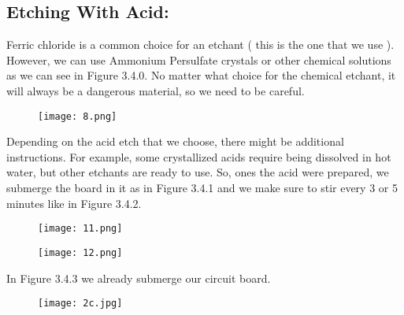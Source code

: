 \subsection{Etching With Acid:}

Ferric chloride is a common choice for an etchant ( this is the one that we use ). However, we can use Ammonium Persulfate crystals or other chemical solutions as we can see in Figure 3.4.0. No matter what choice for the chemical etchant, it will always be a dangerous material, so we need to be careful. \hfill \break

\begin{figure}[H]
\texttt{[image: 8.png]}
\centering \linebreak {}
\end{figure} \hfill \break

Depending on the acid etch that we choose, there might be additional instructions. For example, some crystallized acids require being dissolved in hot water, but other etchants are ready to use. So, ones the acid were prepared, we submerge the board in it as in Figure 3.4.1 and we make sure to stir every 3 or 5 minutes like in Figure 3.4.2.\hfill \break

\begin{figure}[H]
\texttt{[image: 11.png]}
\centering \linebreak {}
\end{figure} \hfill \break

\begin{figure}[H]
\texttt{[image: 12.png]}
\centering \linebreak {}
\end{figure}

\pagebreak

In Figure 3.4.3 we already submerge our circuit board. \hfill \break

\begin{figure}[H]
\texttt{[image: 2c.jpg]}
\centering \linebreak {}
\end{figure} \hfill \break

